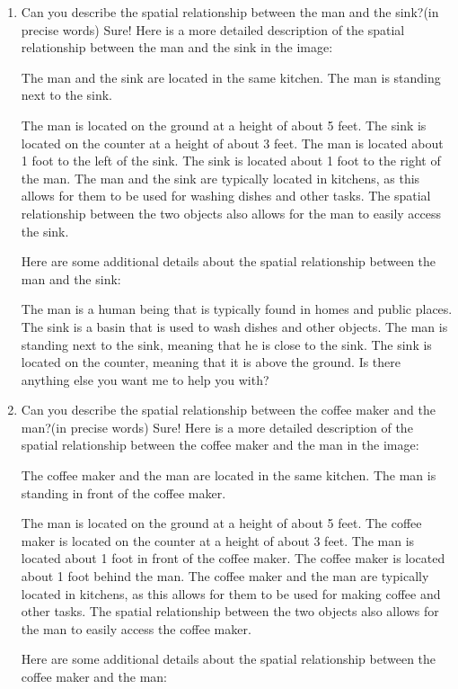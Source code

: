 \begin{enumerate}
    \item Can you describe the spatial relationship between the man and the sink?(in precise words)
    \subitem Sure! Here is a more detailed description of the spatial relationship between the man and the sink in the image:

    The man and the sink are located in the same kitchen. The man is standing next to the sink.
    
    The man is located on the ground at a height of about 5 feet.
    The sink is located on the counter at a height of about 3 feet.
    The man is located about 1 foot to the left of the sink.
    The sink is located about 1 foot to the right of the man.
    The man and the sink are typically located in kitchens, as this allows for them to be used for washing dishes and other tasks. The spatial relationship between the two objects also allows for the man to easily access the sink.
    
    Here are some additional details about the spatial relationship between the man and the sink:
    
    The man is a human being that is typically found in homes and public places.
    The sink is a basin that is used to wash dishes and other objects.
    The man is standing next to the sink, meaning that he is close to the sink.
    The sink is located on the counter, meaning that it is above the ground.
    Is there anything else you want me to help you with?
    \item Can you describe the spatial relationship between the coffee maker and the man?(in precise words)
    \subitem Sure! Here is a more detailed description of the spatial relationship between the coffee maker and the man in the image:

    The coffee maker and the man are located in the same kitchen. The man is standing in front of the coffee maker.
    
    The man is located on the ground at a height of about 5 feet.
    The coffee maker is located on the counter at a height of about 3 feet.
    The man is located about 1 foot in front of the coffee maker.
    The coffee maker is located about 1 foot behind the man.
    The coffee maker and the man are typically located in kitchens, as this allows for them to be used for making coffee and other tasks. The spatial relationship between the two objects also allows for the man to easily access the coffee maker.
    
    Here are some additional details about the spatial relationship between the coffee maker and the man:
    

\end{enumerate}
